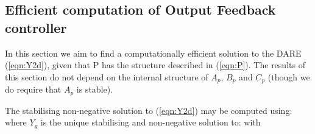 \subsection{Efficient computation of Output Feedback controller}
In this section we aim to find a computationally efficient solution to the DARE (\ref{eqn:Y2d}), given that P has the structure described in (\ref{eqn:P}). The results of this section do not depend on the internal structure of $A_p$, $B_p$ and $C_p$ (though we do require that $A_p$ is stable).

\begin{lem} 
The stabilising non-negative solution to (\ref{eqn:Y2d}) may be computed using:
where $Y_g$ is the unique stabilising and non-negative solution to:
with
\end{lem}
